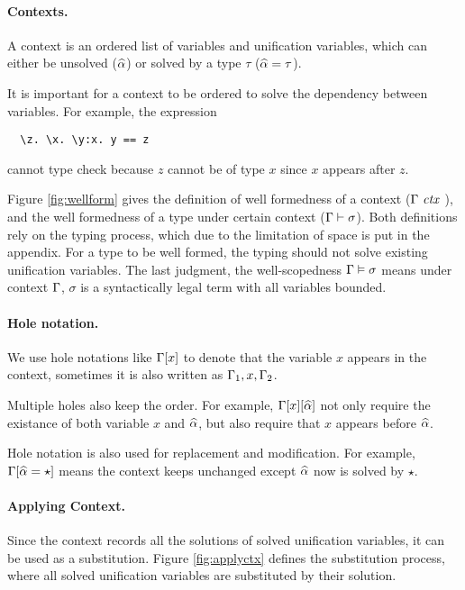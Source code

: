 \paragraph{Contexts.} A context is an ordered list of variables and
unification variables, which
can either be unsolved
($\widehat{\alpha}$) or solved by a type $\tau$ ($\widehat{\alpha} = \tau$).

It is important for a context to be ordered to solve the dependency between
variables.
For example, the expression

\begin{lstlisting}
  \z. \x. \y:x. y == z
\end{lstlisting}

\noindent cannot type check because $z$ cannot be of type $x$ since $x$
appears after $z$.

Figure \ref{fig:wellform} gives the definition of well formedness of a context
($\Gamma \ \mathit{ctx}\ $),
and the well formedness of
a type under certain context ($\Gamma \vdash \sigma$).
Both definitions rely on the typing process,
which due to the limitation of space is put in the appendix.
For a type to be well formed, the typing should not solve existing unification
variables.
The last judgment, the
well-scopedness
$\Gamma \vDash \sigma$ means under context $\Gamma$, $\sigma$ is a syntactically
legal term with all variables bounded.

\paragraph{Hole notation.} We use hole notations like $\Gamma[x]$ to
denote that the variable $x$ appears in the context, sometimes it is also
written as $\Gamma_1, x, \Gamma_2$.

Multiple holes also keep the order. For example, $\Gamma[x][\widehat{\alpha}]$ not only
require the existance of both variable $x$ and $\widehat{\alpha}$, but also require that
$x$ appears before $\widehat{\alpha}$.

Hole notation is also used for replacement and modification. For example,
$\Gamma[\widehat{\alpha} = \star]$ means the context keeps unchanged except $\widehat{\alpha}$
now is solved by $\star$.

\paragraph{Applying Context.} Since the context records all the solutions of
solved unification variables, it can be used as a substitution. Figure
\ref{fig:applyctx} defines the substitution process, where all solved
unification variables are substituted by their solution.

